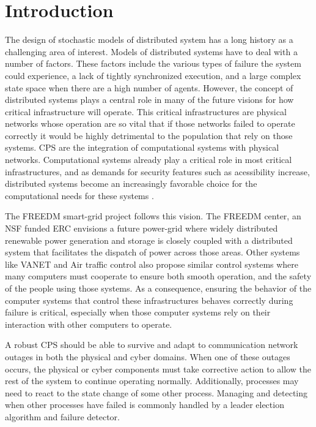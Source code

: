 \chapter{Introduction}

The design of stochastic models of distributed system has a long history as a challenging area of interest.
Models of distributed systems have to deal with a number of factors.
These factors include the various types of failure the system could experience, a lack of tightly synchronized execution, and a large complex state space when there are a high number of agents\cite{DISTRIBUTED}\cite{distributed-challenges}. 
However, the concept of distributed systems plays a central role in many of the future visions for how critical infrastructure will operate.
This critical infrastructures are physical networks whose operation are so vital that if those networks failed to operate correctly it would be highly detrimental to the population that rely on those systems.
\ac{CPS} are the integration of computational systems with physical networks.
Computational systems already play a critical role in most critical infrastructures, and as demands for security features such as acessibility increase, distributed systems become an increasingly favorable choice for the computational needs for these systems \cite{SMARTGRIDBENEFITS}.

The \ac{FREEDM}\cite{FREEDM} smart-grid project follows this vision.
The \ac{FREEDM} center, an NSF funded ERC envisions a future power-grid where widely distributed renewable power generation and storage is closely coupled with a distributed system that facilitates the dispatch of power across those areas.
Other systems like \ac{VANET}\cite{CARS1}\cite{CARS2}\cite{vanet-congestion} and Air traffic control \cite{AIRTRAFFIC1}\cite{AIRTRAFFIC2} also propose similar control systems where many computers must cooperate to ensure both smooth operation, and the safety of the people using those systems.
As a consequence, ensuring the behavior of the computer systems that control these infrastructures behaves correctly during failure is critical, especially when those computer systems rely on their interaction with other computers to operate.

A robust \ac{CPS} should be able to survive and adapt to communication network outages in both the physical and cyber domains.
When one of these outages occurs, the physical or cyber components must take corrective action to allow the rest of the system to continue operating normally.
Additionally, processes may need to react to the state change of some other process.
Managing and detecting when other processes have failed is commonly handled by a leader election algorithm and failure detector.

